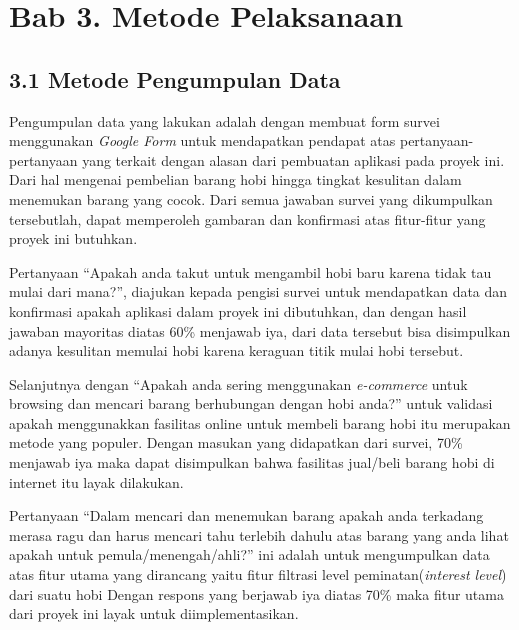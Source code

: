 \documentclass[a4paper]{article}
\begin{document}
\newpage
\section*{Bab 3. Metode Pelaksanaan}
\subsection*{3.1 Metode Pengumpulan Data}


Pengumpulan data yang lakukan adalah dengan membuat form survei menggunakan \textit{Google Form} untuk mendapatkan pendapat atas pertanyaan-pertanyaan yang terkait dengan alasan dari pembuatan aplikasi pada proyek ini. Dari hal mengenai pembelian barang hobi hingga tingkat kesulitan dalam menemukan barang yang cocok. Dari semua jawaban survei yang dikumpulkan tersebutlah, dapat memperoleh gambaran dan konfirmasi atas fitur-fitur yang proyek ini butuhkan.


Pertanyaan “Apakah anda takut untuk mengambil hobi baru karena tidak tau mulai dari mana?”, diajukan kepada pengisi survei untuk mendapatkan data dan konfirmasi apakah aplikasi dalam proyek ini dibutuhkan, dan dengan hasil jawaban mayoritas diatas 60\% menjawab iya, dari data tersebut bisa disimpulkan adanya kesulitan memulai hobi karena keraguan titik mulai hobi tersebut.


Selanjutnya dengan “Apakah anda sering menggunakan \textit{e-commerce} untuk browsing dan mencari barang berhubungan dengan hobi anda?” untuk validasi apakah menggunakkan fasilitas online untuk membeli barang hobi itu merupakan metode yang populer. Dengan masukan yang didapatkan dari survei, 70\% menjawab iya maka dapat disimpulkan bahwa fasilitas jual/beli barang hobi di internet itu layak dilakukan.


Pertanyaan “Dalam mencari dan menemukan barang apakah anda terkadang merasa ragu dan harus mencari tahu terlebih dahulu atas barang yang anda lihat apakah untuk pemula/menengah/ahli?” ini adalah untuk mengumpulkan data atas fitur utama yang dirancang yaitu fitur filtrasi level peminatan(\textit{interest level}) dari suatu hobi Dengan respons yang berjawab iya diatas 70\% maka fitur utama dari proyek ini layak untuk diimplementasikan.

\end{document}
